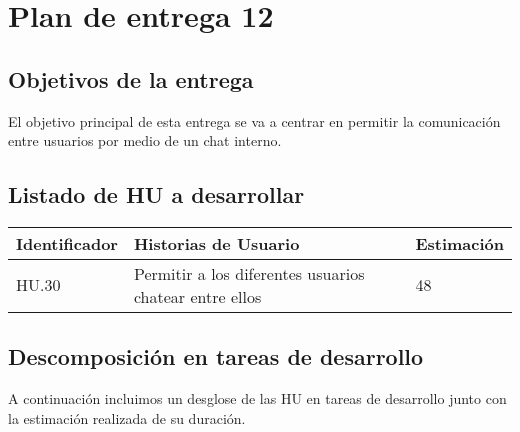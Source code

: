 \section{Plan de entrega 12}

\subsection{Objetivos de la entrega}

El objetivo principal de esta entrega se va a centrar en permitir la comunicación entre usuarios por medio de un chat interno.

\subsection{Listado de HU a desarrollar}

\begin{table}[h]
	\centering
	\begin{tabular}{| p{2.3cm} | p{6.7cm} | p{2cm} |}
		\rowcolor[HTML]{329A9D} 
		{\color[HTML]{FFFFFF} \textbf{Identificador}} & {\color[HTML]{FFFFFF} \textbf{Historias de Usuario}} & {\color[HTML]{FFFFFF} \textbf{Estimación}}  \\ \hline
		HU.30 & Permitir a los diferentes usuarios chatear entre ellos & 48 \\ \hline
	\end{tabular}
\end{table}

\newpage

\subsection{Descomposición en tareas de desarrollo}

A continuación incluimos un desglose de las HU en tareas de desarrollo junto con la estimación realizada de su duración.\\

